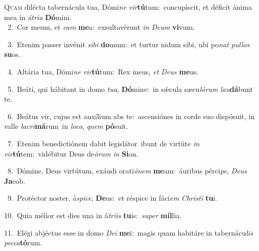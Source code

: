 \lettrine{\initial\textcolor{\initialcolor}{Q}}{uam} dilécta tabernácula tua, Dómi\textit{ne} \textit{vir}\-\textbf{tú}tum:~\star concupíscit, et déficit ánima mea in \textit{á}\-\textit{tri}\textit{a} \textbf{Dó}\-mini.\\
{\numbfont\textcolor{\numbcolor}{~2.}}~Cor meum, et \textit{ca}\-\textit{ro} \textbf{me}\-a:~\star exsultavérunt \textit{in} \textit{De}\-\textit{um} \textbf{vi}\-vum.\par
{\numbfont\textcolor{\numbcolor}{~3.}}~Etenim passer invénit \textit{si}\-\textit{bi} \textbf{do}\-mum:~\star et turtur nidum sibi, ubi po\textit{nat} \textit{pul}\-\textit{los} \textbf{su}\-os.\par
{\numbfont\textcolor{\numbcolor}{~4.}}~Altária tua, Dómi\textit{ne} \textit{vir}\-\textbf{tú}tum:~\star Rex meus, \textit{et} \textit{De}\-\textit{us} \textbf{me}\-us.\par
{\numbfont\textcolor{\numbcolor}{~5.}}~Beáti, qui hábitant in domo \textit{tu}\-\textit{a}, \textbf{Dó}\-mine:~\star in sǽcula sæcu\-\textit{ló}\-\textit{rum} \textit{lau}\-\textbf{dá}bunt te.\par
{\numbfont\textcolor{\numbcolor}{~6.}}~Beátus vir, cujus est auxílium abs te:~\dagger ascensiónes in corde suo dispósuit, in valle \textit{la}\-\textit{cri}\textbf{má}rum~\star in \textit{lo}\-\textit{co}, \textit{quem} \textbf{pó}\-suit.\par
{\numbfont\textcolor{\numbcolor}{~7.}}~Etenim benedictiónem dabit legislátor~\dagger ibunt de virtúte \textit{in} \textit{vir}\-\textbf{tú}tem:~\star vidébitur Deus de\-\textit{ó}\-\textit{rum} \textit{in} \textbf{Si}\-on.\par
{\numbfont\textcolor{\numbcolor}{~8.}}~Dómine, Deus virtútum, exáudi orati\-\textit{ó}\-\textit{nem} \textbf{me}\-am:~\star áuribus pérci\-\textit{pe}\-, \textit{De}\-\textit{us} \textbf{Ja}\-cob.\par
{\numbfont\textcolor{\numbcolor}{~9.}}~Protéctor noster, á\-\textit{spi}\-\textit{ce}, \textbf{De}\-us:~\star et réspice in fáci\textit{em} \textit{Chris}\-\textit{ti} \textbf{tu}\-i.\par
{\numbfont\textcolor{\numbcolor}{10.}}~Quia mélior est dies una in á\-\textit{tri}\-\textit{is} \textbf{tu}\-is:~\star \textit{su}\-\textit{per} \textbf{míl}\-lia.\par
{\numbfont\textcolor{\numbcolor}{11.}}~Elégi abjéctus esse in domo \textit{De}\-\textit{i} \textbf{me}\-i:~\star magis quam habitáre in tabernácu\textit{lis} \textit{pec}\-\textit{ca}\textbf{tó}rum.\par
